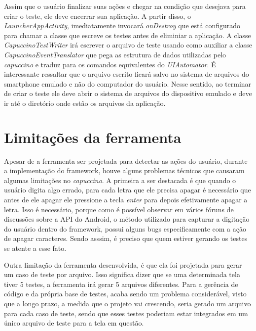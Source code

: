 \documentclass[
    12pt,       %
    openright,      %
    twoside,      %
    a4paper,      %
    english,      %
    french,       %
    spanish,      %
    brazil,       %
    ]{abntex2}
\begin{document}
        Assim que o usuário finalizar suas ações e chegar na condição que desejava para criar o teste, ele
        deve encerrar sua aplicação. A partir disso, o \textit{LauncherAppActivity}, imediatamente invocará
        \textit{onDestroy} que está configurado para chamar a classe que escreve os testes antes de eliminiar
        a aplicação. A classe \textit{CapuccinoTestWriter} irá escrever o arquivo de teste usando como auxiliar
        a classe \textit{CapuccinoEventTranslator} que pega as estrutura de dados utilizadas pelo
        \textit{capuccino} e traduz para os comandos equivalentes do \textit{UIAutomator}. É interessante
        ressaltar que o arquivo escrito ficará salvo no sistema de arquivos do smartphone emulado e não
        do computador do usuário. Nesse sentido, ao terminar de criar o teste ele deve abrir o sistema
        de arquivos do dispositivo emulado e deve ir até o diretório onde estão os arquivos da aplicação.

      \section{Limitações da ferramenta}
        Apesar de a ferramenta ser projetada para detectar as ações do usuário, durante a implementação
        do framework, houve alguns problemas técnicos que causaram algumas limitações no \textit{capuccino}.
        A primeira a ser destacada é que quando o usuário digita algo errado, para cada
        letra que ele precisa apagar é necessário que antes de ele apagar ele pressione a tecla \textit{enter}
        para depois efetivamente apagar a letra. Isso é necessário, porque como é possível observar em vários
        fóruns de discussões sobre a API do Android, o método utilizado para capturar a digitação do usuário
        dentro do framework, possui alguns bugs especificamente com a ação de apagar caracteres. Sendo asssim,
        é preciso que quem estiver gerando os testes se atente a esse fato.

        Outra limitação da ferramenta desenvolvida, é que ela foi projetada para gerar um caso de teste por
        arquivo. Isso significa dizer que se uma determinada tela tiver 5 testes, a ferramenta irá gerar 5
        arquivos diferentes. Para a gerência de código e da própria base de testes, acaba sendo um problema considerável, visto que a longo prazo, a medida que o projeto vai crescendo, seria gerado um arquivo
        para cada caso de teste, sendo que esses testes poderiam estar integrados em um único arquivo de teste
        para a tela em questão.
\end{document}
